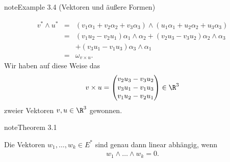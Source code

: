 \documentclass[letterpaper,10pt,english]{jupyterBook}
\begin{document}
\begin{sphinxadmonition}{note}{Example 3.4 (Vektoren und äußere Formen)}
\begin{itemize}
\end{itemize}
\begin{equation*}
\begin{split}v^*\wedge u^* &=& (v_1\alpha_1+v_2\alpha_2+v_3\alpha_3)
\wedge(u_1\alpha_1+u_2\alpha_2+u_3\alpha_3)\\
&=& (v_1u_2-v_2u_1)\alpha_1\wedge\alpha_2+(v_2u_3-v_3u_2)\alpha_2\wedge
\alpha_3\\
&& + (v_3u_1-v_1u_3)\alpha_3\wedge\alpha_1\\
&=& \omega_{v\times u}.\end{split}
\end{equation*}
\sphinxAtStartPar
Wir haben auf diese Weise das 
\begin{equation*}
\begin{split}v\times u=\begin{pmatrix} v_2u_3-v_3u_2\\v_3u_1-v_1u_3 \\ v_1u_2-v_2u_1 \end{pmatrix} \in\R^3\end{split}
\end{equation*}
\sphinxAtStartPar
zweier Vektoren \(v,u\in\R^3\) gewonnen.
\end{sphinxadmonition}
\label{vektoranalysis/multilinear:theorem-20}
\begin{sphinxadmonition}{note}{Theorem 3.1}



\sphinxAtStartPar
Die Vektoren \(w_1,\ldots,w_k\in E^*\) sind genau dann linear abhängig, wenn
\begin{equation*}
\begin{split}w_1\wedge\ldots\wedge w_k=0.\end{split}
\end{equation*}\end{sphinxadmonition}
\end{document}
